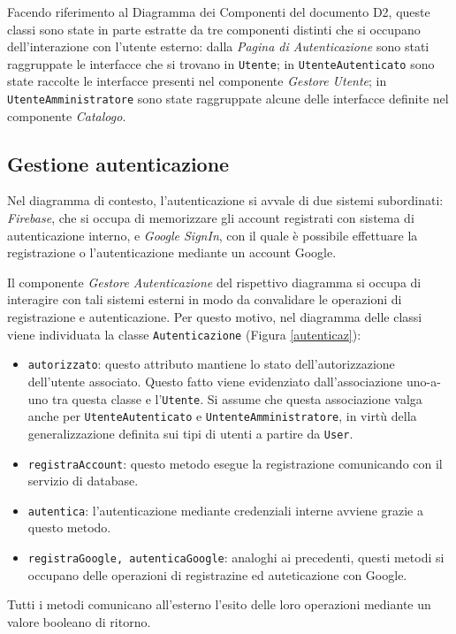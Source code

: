 \documentclass[11pt, a4paper]{article}
\theoremstyle{definition} %
\begin{document}
Facendo riferimento al Diagramma dei Componenti del
documento D2, queste classi sono state in parte estratte da tre componenti
distinti che si occupano dell'interazione con l'utente esterno: dalla
\textit{Pagina di Autenticazione} sono stati raggruppate le interfacce che
si trovano in \texttt{Utente}; in \texttt{UtenteAutenticato} sono state
raccolte le interfacce presenti nel componente \textit{Gestore Utente};
in \texttt{UtenteAmministratore} sono state raggruppate alcune delle interfacce
definite nel componente \textit{Catalogo}.






\newpage
\subsection{Gestione autenticazione}
Nel diagramma di contesto, l'autenticazione si avvale di due sistemi
subordinati: \textit{Firebase}, che si occupa di memorizzare gli account
registrati con sistema di autenticazione interno, e \textit{Google SignIn},
con il quale è possibile effettuare la registrazione o l'autenticazione
mediante un account Google.

Il componente \textit{Gestore Autenticazione} del rispettivo diagramma si
occupa di interagire con tali sistemi esterni in modo da convalidare le
operazioni di registrazione e autenticazione. Per questo motivo, nel diagramma
delle classi viene individuata la classe \texttt{Autenticazione} (Figura \ref{autenticaz}):
\begin{itemize}
    \item \texttt{autorizzato}: questo attributo mantiene lo stato dell'autorizzazione
    dell'utente associato. Questo fatto viene evidenziato dall'associazione
    uno-a-uno tra questa classe e l'\texttt{Utente}. Si assume che questa
    associazione valga anche per \texttt{UtenteAutenticato} e \texttt{UntenteAmministratore},
    in virtù della generalizzazione definita sui tipi di utenti a partire da \texttt{User}.
    \item \texttt{registraAccount}: questo metodo esegue la registrazione
    comunicando con il servizio di database.
    \item \texttt{autentica}: l'autenticazione mediante credenziali interne
    avviene grazie a questo metodo.
    \item \texttt{registraGoogle, autenticaGoogle}: analoghi ai precedenti,
    questi metodi si occupano delle operazioni di registrazine ed auteticazione
    con Google.
\end{itemize}
Tutti i metodi comunicano all'esterno l'esito delle loro operazioni mediante
un valore booleano di ritorno.
\end{document}
